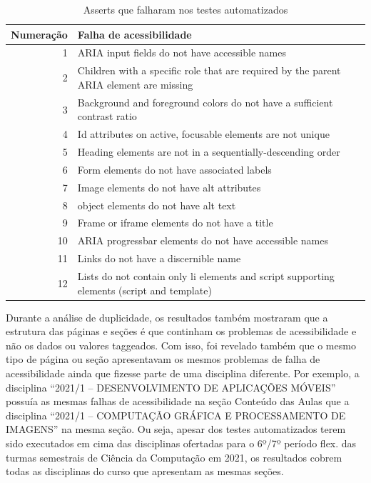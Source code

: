 \documentclass[
	12pt,				%
	openright,			%
	oneside,			%
	a4paper,			%
	chapter=TITLE,		%
	section=TITLE,		%
	subsection=TITLE,	%
	subsubsection=TITLE,%
	english,			%
	brazil				%
	]{abntex2}
\theoremstyle{definition}
\begin{document}
\begin{table}[h]
\centering
\caption{Asserts que falharam nos testes automatizados}
\begin{tabular}{r|lr}

Numera{\c c}{\~a}o & Falha de acessibilidade \\ %
\hline                               %
1 & ARIA input fields do not have accessible names       \\
2 & Children with a specific role that are required by the parent ARIA element are missing \\
3 & Background and foreground colors do not have a sufficient contrast ratio             \\
4 & Id attributes on active, focusable elements are not unique        \\
5 & Heading elements are not in a sequentially-descending order \\             
6 & Form elements do not have associated labels \\
7 & Image elements do not have alt attributes \\
8 & object elements do not have alt text \\
9 & Frame or iframe elements do not have a title \\
10 & ARIA progressbar elements do not have accessible names \\
11 & Links do not have a discernible name \\
12 & Lists do not contain only li elements and script supporting elements (script and template)

\end{tabular}
\end{table}






Durante a análise de duplicidade, os resultados também mostraram que a estrutura das páginas e seções é que continham os problemas de acessibilidade e não os dados ou valores taggeados. Com isso, foi revelado também que o mesmo tipo de página ou seção apresentavam os mesmos problemas de falha de acessibilidade ainda que fizesse parte de uma disciplina diferente. Por exemplo, a disciplina “2021/1 – DESENVOLVIMENTO DE APLICAÇÕES MÓVEIS” possuía as mesmas falhas de acessibilidade na seção Conteúdo das Aulas que a disciplina “2021/1 – COMPUTAÇÃO GRÁFICA E PROCESSAMENTO DE IMAGENS” na mesma seção. Ou seja, apesar dos testes automatizados terem sido executados em cima das disciplinas ofertadas para o 6º/7º período flex. das turmas semestrais de Ciência da Computação em 2021, os resultados cobrem todas as disciplinas do curso que apresentam as mesmas seções.
\end{document}
